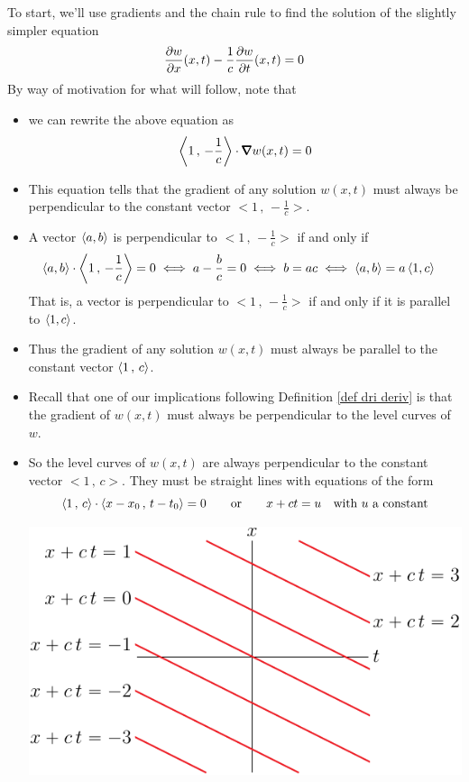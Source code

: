 To start, we'll use gradients and the chain rule to find the solution
of the slightly simpler equation
\begin{equation*}
\pdiff{w}{x}(x,t)-\frac{1}{c}\pdiff{w}{t}(x,t)=0
\end{equation*}
By way of motivation for what will follow, note that
\begin{itemize} 
\item 
we can rewrite the above equation as
\begin{equation*}
\llt 1\,,\,-\frac{1}{c}\rgt\cdot \vnabla w(x,t) =0
\end{equation*}
\item
This equation tells that the gradient of any solution $w(x,t)$ must always be 
perpendicular to the constant vector $\big< 1\,,\,-\frac{1}{c}\big>$.
\item
A vector $\left< a,b\right>$ is perpendicular to $\big< 1\,,\,-\frac{1}{c}\big>$
if and only if 
\begin{align*}
\left< a,b\right> \cdot \left< 1\,,\,-\frac{1}{c}\right> =0
&\iff a-\frac{b}{c} = 0
\iff b=ac
\iff \left< a,b\right> =a \left< 1,c\right>
\end{align*}
That is, a vector is perpendicular to $\big< 1\,,\,-\frac{1}{c}\big>$
if and only if it is parallel to $\left< 1,c\right>$.
\item
Thus the gradient of any solution $w(x,t)$ must always be parallel 
to the constant vector $\left< 1\,,\,c\right>$. 
\item 
Recall that one of our implications following Definition 
\ref{def dri deriv} is that the gradient of $w(x,t)$ must always be 
perpendicular to the level curves of $w$. 
\item
So the level curves of $w(x,t)$ are always perpendicular to the
constant vector $\big< 1\,,\,c\big>$. They must be straight lines
with equations of the form
\begin{equation*}
\left< 1\,,\,c\right>\cdot\left< x-x_0\,,\,t-t_0\right> =0\qquad\text{or}\qquad
x+ct=u\quad\text{with $u$ a constant}
\end{equation*}
\begin{nfig}
\begin{center}
   \includegraphics{level.pdf}
\end{center}
\end{nfig}


\end{itemize}
